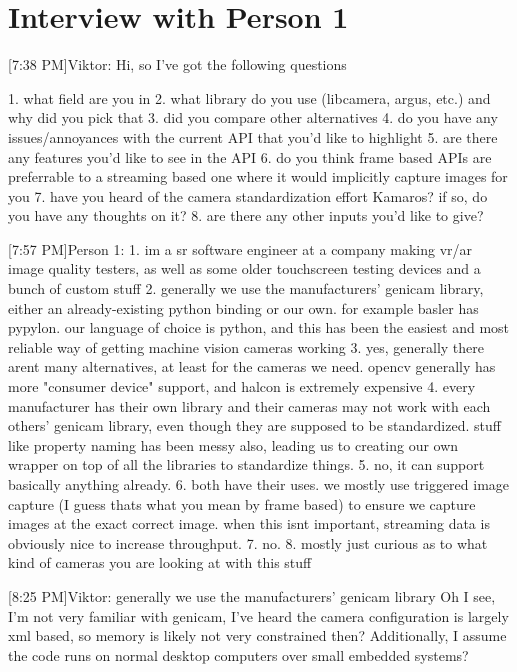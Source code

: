 
\section{Interview with Person 1}\label{interview:vrar}
[7:38 PM]Viktor: Hi, so I've got the following questions

1. what field are you in
2. what library do you use (libcamera, argus, etc.) and why did you pick that
3. did you compare other alternatives
4. do you have any issues/annoyances with the current API that you'd like to highlight
5. are there any features you'd like to see in the API
6. do you think frame based APIs are preferrable to a streaming based one where it would implicitly capture images for you
7. have you heard of the camera standardization effort Kamaros? if so, do you have any thoughts on it?
8. are there any other inputs you'd like to give?

[7:57 PM]Person 1:
1. im a sr software engineer at a company making vr/ar image quality testers, as well as some older touchscreen testing devices and a bunch of custom stuff
2. generally we use the manufacturers' genicam library, either an already-existing python binding or our own. for example basler has pypylon. our language of choice is python, and this has been the easiest and most reliable way of getting machine vision cameras working
3. yes, generally there arent many alternatives, at least for the cameras we need. opencv generally has more "consumer device" support, and halcon is extremely expensive
4. every manufacturer has their own library and their cameras may not work with each others' genicam library, even though they are supposed to be standardized. stuff like property naming has been messy also, leading us to creating our own wrapper on top of all the libraries to standardize things.
5. no, it can support basically anything already.
6. both have their uses. we mostly use triggered image capture (I guess thats what you mean by frame based) to ensure we capture images at the exact correct image. when this isnt important, streaming data is obviously nice to increase throughput.
7. no.
8. mostly just curious as to what kind of cameras you are looking at with this stuff

[8:25 PM]Viktor:
generally we use the manufacturers' genicam library
Oh I see, I'm not very familiar with genicam, I've heard the camera configuration is largely xml based, so memory is likely not very constrained then? Additionally, I assume the code runs on normal desktop computers over small embedded systems?

